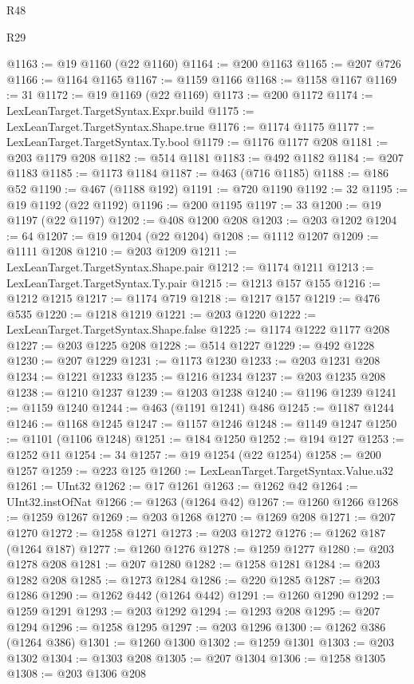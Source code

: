 \begin{lexlean}{R48}
\begin{lexlean}{R29}
\begin{coremodule}
{{{{{{{{{{{{{{{{{{{{{{{{{{{{{{{{{{{{{{{{{{{{{{{{{{{{{{{{{{{{{{{{{{{{{{{{{{{{{{{{{{{{{{{{{{{{{{{{{{{{{{{{{{{{{{{{{{{{{{{{{{{{{{{{{{{{{{{{{{{{{{{{{{{{{{{{{{{{{{{{{{{{{{{{{{{{{{{{{{{{{{{{{{{{{{{{{{{{{{{{{{{{{{{{{{{{{{{{{{@1163 := @19 @1160 (@22 @1160)
@1164 := @200 @1163
@1165 := @207 @726
@1166 := @1164 @1165
@1167 := @1159 @1166
@1168 := @1158 @1167
@1169 := 31
@1172 := @19 @1169 (@22 @1169)
@1173 := @200 @1172
@1174 := LexLeanTarget.TargetSyntax.Expr.build
@1175 := LexLeanTarget.TargetSyntax.Shape.true
@1176 := @1174 @1175
@1177 := LexLeanTarget.TargetSyntax.Ty.bool
@1179 := @1176 @1177 @208
@1181 := @203 @1179 @208
@1182 := @514 @1181
@1183 := @492 @1182
@1184 := @207 @1183
@1185 := @1173 @1184
@1187 := @463 (@716 @1185)
@1188 := @186 @52
@1190 := @467 (@1188 @192)
@1191 := @720 @1190
@1192 := 32
@1195 := @19 @1192 (@22 @1192)
@1196 := @200 @1195
@1197 := 33
@1200 := @19 @1197 (@22 @1197)
@1202 := @408 @1200 @208
@1203 := @203 @1202
@1204 := 64
@1207 := @19 @1204 (@22 @1204)
@1208 := @1112 @1207
@1209 := @1111 @1208
@1210 := @203 @1209
@1211 := LexLeanTarget.TargetSyntax.Shape.pair
@1212 := @1174 @1211
@1213 := LexLeanTarget.TargetSyntax.Ty.pair
@1215 := @1213 @157 @155
@1216 := @1212 @1215
@1217 := @1174 @719
@1218 := @1217 @157
@1219 := @476 @535
@1220 := @1218 @1219
@1221 := @203 @1220
@1222 := LexLeanTarget.TargetSyntax.Shape.false
@1225 := @1174 @1222 @1177 @208
@1227 := @203 @1225 @208
@1228 := @514 @1227
@1229 := @492 @1228
@1230 := @207 @1229
@1231 := @1173 @1230
@1233 := @203 @1231 @208
@1234 := @1221 @1233
@1235 := @1216 @1234
@1237 := @203 @1235 @208
@1238 := @1210 @1237
@1239 := @1203 @1238
@1240 := @1196 @1239
@1241 := @1159 @1240
@1244 := @463 (@1191 @1241) @486
@1245 := @1187 @1244
@1246 := @1168 @1245
@1247 := @1157 @1246
@1248 := @1149 @1247
@1250 := @1101 (@1106 @1248)
@1251 := @184 @1250
@1252 := @194 @127
@1253 := @1252 @11
@1254 := 34
@1257 := @19 @1254 (@22 @1254)
@1258 := @200 @1257
@1259 := @223 @125
@1260 := LexLeanTarget.TargetSyntax.Value.u32
@1261 := UInt32
@1262 := @17 @1261
@1263 := @1262 @42
@1264 := UInt32.instOfNat
@1266 := @1263 (@1264 @42)
@1267 := @1260 @1266
@1268 := @1259 @1267
@1269 := @203 @1268
@1270 := @1269 @208
@1271 := @207 @1270
@1272 := @1258 @1271
@1273 := @203 @1272
@1276 := @1262 @187 (@1264 @187)
@1277 := @1260 @1276
@1278 := @1259 @1277
@1280 := @203 @1278 @208
@1281 := @207 @1280
@1282 := @1258 @1281
@1284 := @203 @1282 @208
@1285 := @1273 @1284
@1286 := @220 @1285
@1287 := @203 @1286
@1290 := @1262 @442 (@1264 @442)
@1291 := @1260 @1290
@1292 := @1259 @1291
@1293 := @203 @1292
@1294 := @1293 @208
@1295 := @207 @1294
@1296 := @1258 @1295
@1297 := @203 @1296
@1300 := @1262 @386 (@1264 @386)
@1301 := @1260 @1300
@1302 := @1259 @1301
@1303 := @203 @1302
@1304 := @1303 @208
@1305 := @207 @1304
@1306 := @1258 @1305
@1308 := @203 @1306 @208
}}}}}}}}}}}}}}}}}}}}}}}}}}}}}}}}}}}}}}}}}}}}}}}}}}}}}}}}}}}}}}}}}}}}}}}}}}}}}}}}}}}}}}}}}}}}}}}}}}}}}}}}}}}}}}}}}}}}}}}}}}}}}}}}}}}}}}}}}}}}}}}}}}}}}}}}}}}}}}}}}}}}}}}}}}}}}}}}}}}}}}}}}}}}}}}}}}}}}}}}}}}}}}}}}}}}}}}}}}
\end{coremodule}
\end{lexlean}
\end{lexlean}
